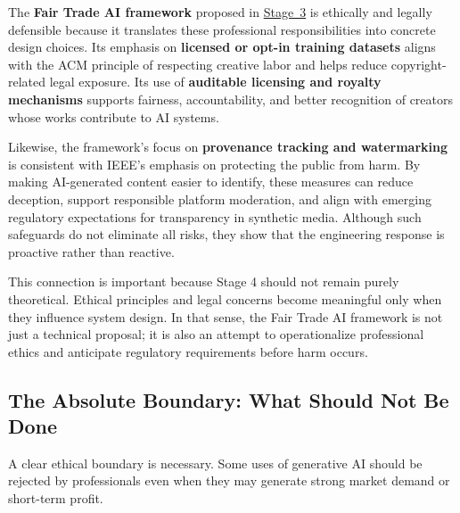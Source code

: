 The \textbf{Fair Trade AI framework} proposed in \hyperref[sec:solution-design]{Stage~3} is ethically and legally defensible because it translates these professional responsibilities into concrete design choices. Its emphasis on \textbf{licensed or opt-in training datasets} aligns with the ACM principle of respecting creative labor and helps reduce copyright-related legal exposure. Its use of \textbf{auditable licensing and royalty mechanisms} supports fairness, accountability, and better recognition of creators whose works contribute to AI systems.

Likewise, the framework's focus on \textbf{provenance tracking and watermarking} is consistent with IEEE's emphasis on protecting the public from harm. By making AI-generated content easier to identify, these measures can reduce deception, support responsible platform moderation, and align with emerging regulatory expectations for transparency in synthetic media. Although such safeguards do not eliminate all risks, they show that the engineering response is proactive rather than reactive.

This connection is important because Stage 4 should not remain purely theoretical. Ethical principles and legal concerns become meaningful only when they influence system design. In that sense, the Fair Trade AI framework is not just a technical proposal; it is also an attempt to operationalize professional ethics and anticipate regulatory requirements before harm occurs.

\subsection{The Absolute Boundary: What Should Not Be Done}\label{sec:boundaries}

A clear ethical boundary is necessary. Some uses of generative AI should be rejected by professionals even when they may generate strong market demand or short-term profit.

